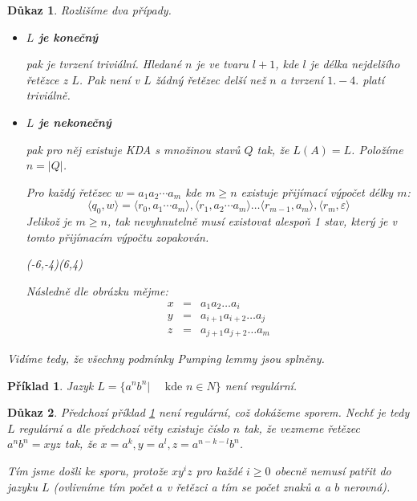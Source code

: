 \documentclass[10pt, a4paper, titlepage]{article}
\theoremstyle{note}
\newtheorem{dukaz}{Důkaz}
\newtheorem{priklad}{Příklad}
\begin{document}
\begin{dukaz}
Rozlišíme dva případy.
\begin{itemize}
\item
\textbf{$L$ je konečný}
 
pak je tvrzení triviální. Hledané $n$ je ve tvaru $l+1$, kde $l$ je délka nejdelšího řetězce z $L$. Pak není v $L$ žádný řetězec delší než $n$ a tvrzení $1. - 4.$ platí triviálně.
 
\item
\textbf{$L$ je nekonečný} 

pak pro něj existuje KDA s množinou stavů $Q$ tak, že $L(A) = L$. Položíme $n=|Q|$.

Pro každý řetězec $w=a_1a_2\cdots a_m$ kde $m \ge n$ existuje přijímací výpočet
délky $m$:
$$
\langle q_0,w \rangle = \langle r_0, a_1\cdots a_m \rangle,\langle r_1, a_2\cdots a_m \rangle \ldots \langle r_{m-1}, a_m \rangle, \langle r_m, \varepsilon \rangle
$$
Jelikož je $m \geq n$, tak nevyhnutelně musí existovat alespoň 1 stav, který je v tomto přijímacím výpočtu zopakován.

\begin{center}
\begin{VCPicture}{(-6,-4)(6,4)}


\end{VCPicture}
\end{center}
Následně dle obrázku mějme:
\begin{eqnarray*}
x &=& a_{1}a_{2}\ldots a_{i} \\
y &=& a_{i+1}a_{i+2}\ldots a_{j} \\
z &=& a_{j+1}a_{j+2}\ldots a_{m}
\end{eqnarray*}
\end{itemize}
Vidíme tedy, že všechny podmínky Pumping lemmy jsou splněny.
\end{dukaz}

\begin{priklad}\label{priklad-reg}
 Jazyk $L = \lbrace a^{n}b^{n} | \quad \text{ kde } n \in N \rbrace$ není regulární.
\end{priklad}

\begin{dukaz}
 Předchozí příklad \ref{priklad-reg} není regulární, což dokážeme sporem. Nechť je tedy $L$ regulární a dle předchozí
věty existuje číslo $n$ tak, že vezmeme řetězec $a^{n}b^{n} = xyz$ tak, že $x = a^{k}, y = a^{l}, z = a^{n-k-l}b^{n}$.

Tím jsme došli ke sporu, protože $xy^iz$ pro každé $i \ge 0$ obecně nemusí patřit do jazyku $L$ (ovlivníme tím počet $a$ v řetězci a tím se počet znaků $a$ a $b$ nerovná).
\end{dukaz}
\end{document}
